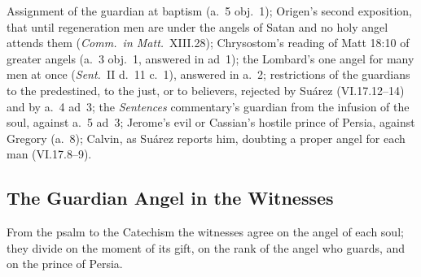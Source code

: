  {Assignment of the guardian at baptism (a.~5 obj.~1); Origen's second
 exposition, that until regeneration men are under the angels of Satan and no
 holy angel attends them (\emph{Comm.\ in Matt.}\ XIII.28); Chrysostom's
 reading of Matt 18:10 of greater angels (a.~3 obj.~1, answered in ad~1); the
 Lombard's one angel for many men at once (\emph{Sent.}\ II d.~11 c.~1),
 answered in a.~2; restrictions of the guardians to the predestined, to the
 just, or to believers, rejected by Suárez (VI.17.12--14) and by a.~4 ad~3;
 the \emph{Sentences} commentary's guardian from the infusion of the soul,
 against a.~5 ad~3; Jerome's evil or Cassian's hostile prince of Persia,
 against Gregory (a.~8); Calvin, as Suárez reports him, doubting a proper
 angel for each man (VI.17.8--9).}

\sectionguard
\subsection{The Guardian Angel in the Witnesses}\label{sec:gd-witnesses}

From the psalm to the Catechism the witnesses agree on the angel of each
soul; they divide on the moment of its gift, on the rank of the angel who
guards, and on the prince of Persia.

